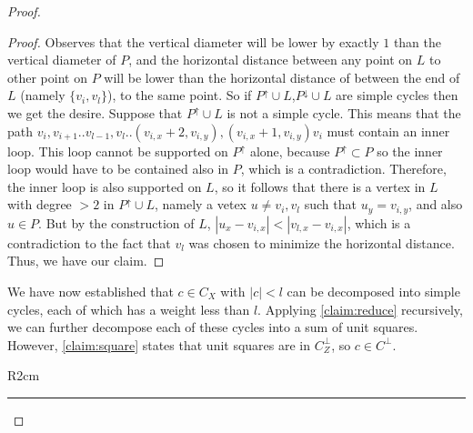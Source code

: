 \begin{proof}
\begin{proof}
Observes that the vertical diameter will be lower by exactly $1$ than the vertical diameter of $P$, and the horizontal distance between any point on $L$ to other point on $P$ will be lower than the horizontal distance of between the end of $L$ (namely $\{v_{i},v_{l}\}$), to the same point. So if $P^{\uparrow}\cup L$,$P^{\downarrow}\cup L$ are simple cycles then we get the desire. 
Suppose that $P^{\uparrow}\cup L$ is not a simple cycle. This means that the path $v_{i},v_{i+1}..v_{l-1},v_{l}.. \left( v_{i,x}+2, v_{i,y} \right), \left( v_{i,x}+1, v_{i,y} \right)v_{i}$ must contain an inner loop. This loop cannot be supported on $P^{\uparrow}$ alone, because $P^{\uparrow} \subset P$ so the inner loop would have to be contained also in $P$, which is a contradiction. Therefore, the inner loop is also supported on $L$, so it follows that there is a vertex in $L$ with degree $>2$ in $P^{\uparrow}\cup L$, namely a vetex $u \neq v_{i},v_{l}$ such that $u_{y} = v_{i,y}$, and also $u \in P$. But by the construction of $L$, $|u_{x} - v_{i,x}| < |v_{l,x} - v_{i,x}|$, which is a contradiction to the fact that $v_{l}$ was chosen to minimize the horizontal distance. Thus, we have our claim.
  \end{proof}


We have now established that $c \in C_{X}$ with $|c| < l$ can be decomposed into simple cycles, each of which has a weight less than $l$. Applying \cref{claim:reduce} recursively, we can further decompose each of these cycles into a sum of unit squares. However, \cref{claim:square} states that unit squares are in $C_{Z}^{\perp}$, so $c \in C^{\perp}$.
    \begin{wrapfigure}{R}{2cm}
      \rule{1cm}{1cm}
\end{wrapfigure}
%


\end{proof}
